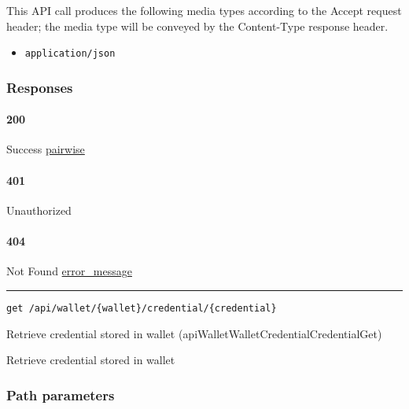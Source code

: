 This API call produces the following media types according to the
{Accept} request header; the media type will be conveyed by the
{Content-Type} response header.

\begin{itemize}
\tightlist
\item
  \texttt{application/json}
\end{itemize}

\hypertarget{responses-192}{%
\subsubsection{Responses}\label{responses-192}}

\hypertarget{section-619}{%
\paragraph{200}\label{section-619}}

Success \protect\hyperlink{pairwise}{pairwise}

\hypertarget{section-620}{%
\paragraph{401}\label{section-620}}

Unauthorized \protect\hyperlink{}{}

\hypertarget{section-621}{%
\paragraph{404}\label{section-621}}

Not Found \protect\hyperlink{error_message}{error\_message}

\begin{center}\rule{0.5\linewidth}{\linethickness}\end{center}

\protect\hypertarget{apiWalletWalletCredentialCredentialGet}{}{}

\begin{verbatim}
get /api/wallet/{wallet}/credential/{credential}
\end{verbatim}

Retrieve credential stored in wallet
({apiWalletWalletCredentialCredentialGet})

Retrieve credential stored in wallet

\hypertarget{path-parameters-106}{%
\subsubsection{Path parameters}\label{path-parameters-106}}

